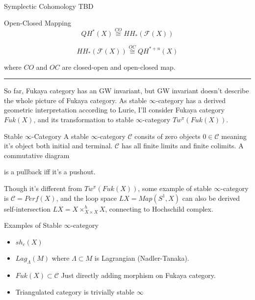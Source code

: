 \documentclass{article}
\begin{document}
\begin{definition}{Symplectic Cohomology}{}
TBD
\end{definition}


\begin{definition}{Open-Closed Mapping}{}
\[ QH^* (X) \overset{CO}{\cong} HH_* (\mathcal{F}(X)) \]

\[ HH_* (\mathcal{F}(X)) \overset{OC}{\cong} QH^{*+n}(X) \]

where $CO$ and $OC$ are closed-open and open-closed map.
\end{definition}


\vspace{0.5cm}
\noindent\rule{\textwidth}{0.4pt}
\vspace{0.5cm}



So far, Fukaya category has an GW invariant, but GW invariant doesn't describe the whole picture of Fukaya category.
As stable $\infty$-category has a derived geometric interpretation according to Lurie,
I'll consider Fukaya category $Fuk(X)$, and its transformation to stable $\infty$-category $Tw^\pi (Fuk(X))$. \\


\begin{definition}{Stable $\infty$-Category}{}
A stable $\infty$-category $\mathcal{C}$ consits of zero objects $0\in\mathcal{C}$ meaning it's object both initial and terminal.
$\mathcal{C}$ has all finite limits and finite colimits. A commutative diagram  \\

is a pullback iff it's a pushout.
\end{definition}


\noindent
Though it's different from $Tw^\pi (Fuk(X))$, some example of stable $\infty$-category is $\mathcal{C}= Perf(X)$,
and the loop space $LX = Map(S^1, X)$ can also be derived self-intersection $LX = X \times_{X\times X}^h X$, 
connecting to Hochschild complex.\\


\begin{example}{Examples of Stable $\infty$-category}{}
\begin{itemize}
\item $sh_c(X)$
\item $Lag_{\Lambda} (M)$ where $\Lambda\subset M$ is Lagrangian (Nadler-Tanaka).
\item $Fuk(X) \subset \mathcal{C}$ Just directly adding morphism on Fukaya category.
\item Triangulated category is trivially stable $\infty$
\end{itemize}
\end{example}
\end{document}
